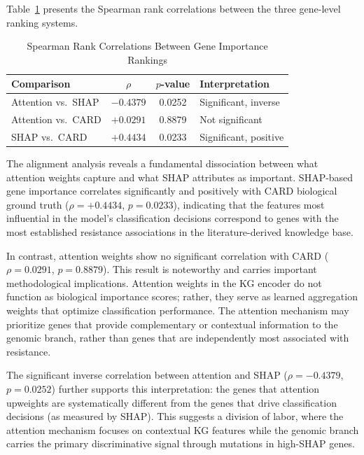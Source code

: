 \documentclass[conference]{IEEEtran}
\begin{document}
Table~\ref{tab:alignment} presents the Spearman rank correlations between the three gene-level ranking systems.

\begin{table}[t]
\centering
\caption{Spearman Rank Correlations Between Gene Importance Rankings}
\label{tab:alignment}
\begin{tabular}{lccl}
\toprule
\textbf{Comparison} & \textbf{$\rho$} & \textbf{$p$-value} & \textbf{Interpretation} \\
\midrule
Attention vs.\ SHAP & $-0.4379$ & 0.0252 & Significant, inverse \\
Attention vs.\ CARD & $+0.0291$ & 0.8879 & Not significant \\
SHAP vs.\ CARD      & $+0.4434$ & 0.0233 & Significant, positive \\
\bottomrule
\end{tabular}
\end{table}

The alignment analysis reveals a fundamental dissociation between what attention weights capture and what SHAP attributes as important. SHAP-based gene importance correlates significantly and positively with CARD biological ground truth ($\rho = +0.4434$, $p = 0.0233$), indicating that the features most influential in the model's classification decisions correspond to genes with the most established resistance associations in the literature-derived knowledge base.

In contrast, attention weights show no significant correlation with CARD ($\rho = 0.0291$, $p = 0.8879$). This result is noteworthy and carries important methodological implications. Attention weights in the KG encoder do not function as biological importance scores; rather, they serve as learned aggregation weights that optimize classification performance. The attention mechanism may prioritize genes that provide complementary or contextual information to the genomic branch, rather than genes that are independently most associated with resistance.

The significant inverse correlation between attention and SHAP ($\rho = -0.4379$, $p = 0.0252$) further supports this interpretation: the genes that attention upweights are systematically different from the genes that drive classification decisions (as measured by SHAP). This suggests a division of labor, where the attention mechanism focuses on contextual KG features while the genomic branch carries the primary discriminative signal through mutations in high-SHAP genes.
\end{document}
